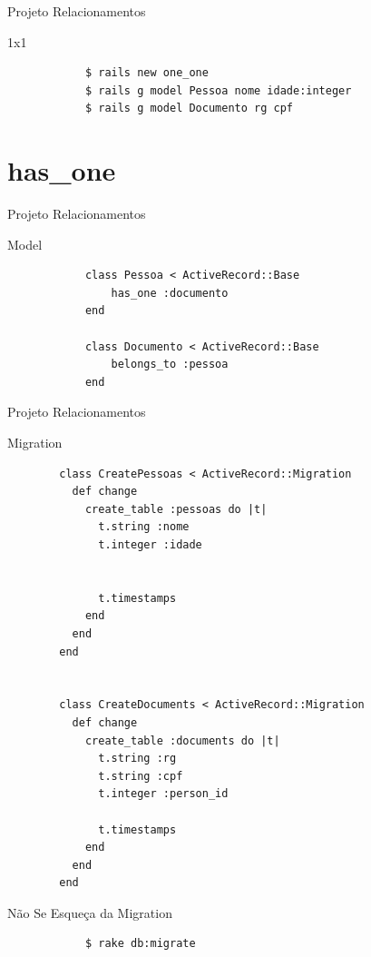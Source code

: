 \documentclass{beamer}
\begin{document}
\begin{frame}[fragile]{Projeto Relacionamentos}
	\begin{block} {\LARGE 1x1}
		\begin{verbatim}
		  	$ rails new one_one
		  	$ rails g model Pessoa nome idade:integer
		  	$ rails g model Documento rg cpf
		\end{verbatim}
	\end{block}
\end{frame}

\section{has\_one}
\begin{frame}[fragile]{Projeto Relacionamentos}
	\begin{block} {\LARGE Model}
		\begin{verbatim}
		  	class Pessoa < ActiveRecord::Base
		  	    has_one :documento
		  	end
		  	
		  	class Documento < ActiveRecord::Base
		  	    belongs_to :pessoa
		  	end
		\end{verbatim}
	\end{block}
\end{frame}

\begin{frame}[fragile]{Projeto Relacionamentos}
	\begin{block}{\LARGE Migration}\fontsize{5}{7}
		\begin{verbatim}
		class CreatePessoas < ActiveRecord::Migration
		  def change
		    create_table :pessoas do |t|
		      t.string :nome
		      t.integer :idade
		    
		
		      t.timestamps
		    end
		  end
		end
		
				
		class CreateDocuments < ActiveRecord::Migration
		  def change
		    create_table :documents do |t|
		      t.string :rg
		      t.string :cpf
		      t.integer :person_id
		
		      t.timestamps
		    end
		  end
		end
		\end{verbatim}
	\end{block}
\end{frame}


\begin{frame}[fragile]{Não Se Esqueça da Migration}
	\begin{block} {
	}
		\begin{verbatim}
		  	$ rake db:migrate
		\end{verbatim}
	\end{block}
\end{frame}
\end{document}
